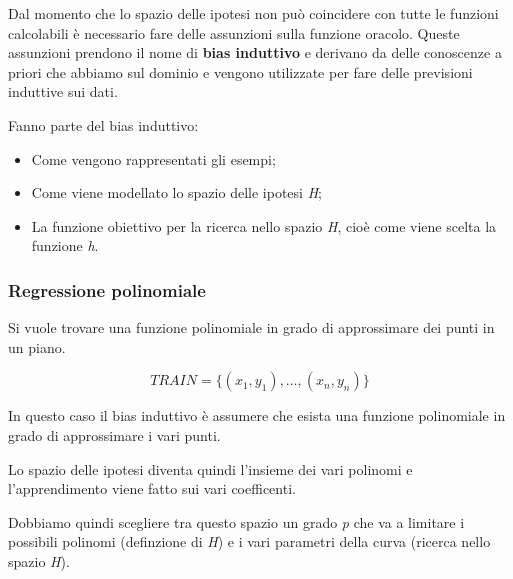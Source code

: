 Dal momento che lo spazio delle ipotesi non può coincidere con tutte le
funzioni calcolabili è necessario fare delle assunzioni sulla funzione
oracolo. 
Queste assunzioni prendono il nome di \textbf{bias induttivo} e
derivano da delle conoscenze a priori che abbiamo sul dominio e
vengono utilizzate per fare delle previsioni induttive sui dati.

Fanno parte del bias induttivo:

\begin{itemize}
\item
  Come vengono rappresentati gli esempi;
\item
  Come viene modellato lo spazio delle ipotesi \emph{H};
\item
  La funzione obiettivo per la ricerca nello spazio \emph{H}, cioè come
  viene scelta la funzione \emph{h}.
\end{itemize}

\subsubsection{Regressione polinomiale}\label{es-regressione-polinomiale}

Si vuole trovare una funzione polinomiale in grado di approssimare dei punti in un piano.

$$
TRAIN = \{(x_1,y_1),\ldots{},(x_n,y_n)\}
$$

In questo caso il bias induttivo è assumere che esista una funzione
polinomiale in grado di approssimare i vari punti.

Lo spazio delle ipotesi diventa quindi l'insieme dei vari polinomi e
l'apprendimento viene fatto sui vari coefficenti.

Dobbiamo quindi scegliere tra questo spazio un grado \emph{p} che va a
limitare i possibili polinomi (definzione di \emph{H}) e i vari
parametri della curva (ricerca nello spazio \emph{H}).
